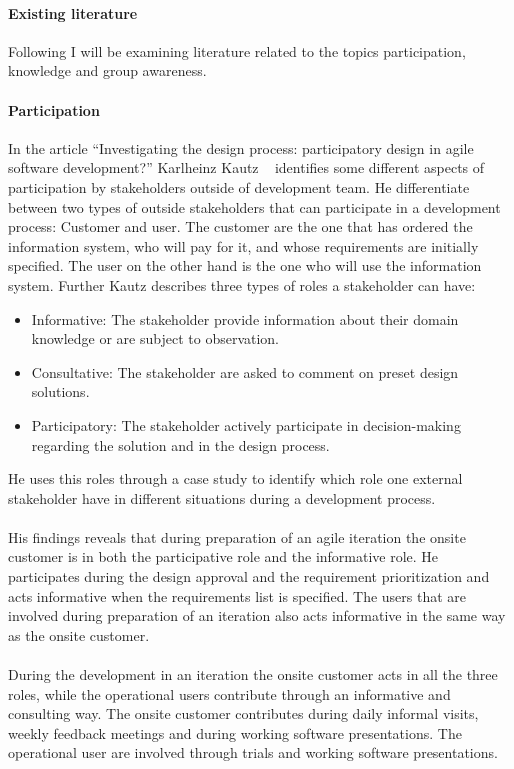 \documentclass[12pt]{article}
\begin{document}
\paragraph{Existing literature}
Following I will be examining literature related to the topics participation, knowledge and group awareness. 

\paragraph{Participation}
In the article ``Investigating the design process: participatory design in agile software development?'' Karlheinz Kautz ~\cite{Kautz} identifies some different aspects of participation by stakeholders outside of development team. He differentiate between two types of outside stakeholders that can participate in a development process: Customer and user. The customer are the one that has ordered the information system, who will pay for it, and whose requirements are initially specified. The user on the other hand is the one who will use the information system. Further Kautz describes three types of roles a stakeholder can have: 
\begin{itemize}
	\item Informative: The stakeholder provide information about their domain knowledge or are subject to observation.
	\item Consultative: The stakeholder are asked to comment on preset design solutions.
	\item Participatory: The stakeholder actively participate in decision-making regarding the solution and in the design process.
\end{itemize}
He uses this roles through a case study to identify which role one external stakeholder have in different situations during a development process. 
\\\\
His findings reveals that during preparation of an agile iteration the onsite customer is in both the participative role and the informative role. He participates during the design approval and the requirement prioritization and acts informative when the requirements list is specified. The users that are involved during preparation of an iteration also acts informative in the same way as the onsite customer.
\\\\
During the development in an iteration the onsite customer acts in all the three roles, while the operational users contribute through an informative and consulting way. The onsite customer contributes during daily informal visits, weekly feedback meetings and during working software presentations. The operational user are involved through trials and working software presentations. 
\end{document}
